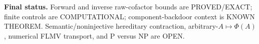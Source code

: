 \documentclass[11pt]{article}
\newcommand{\status}[1]{\textsf{#1}}
\begin{document}
\noindent\textbf{Final status.} Forward and inverse raw-cofactor bounds are \status{PROVED/EXACT}; finite controls are \status{COMPUTATIONAL}; component-backdoor context is \status{KNOWN THEOREM}.  Semantic/noninjective hereditary contraction, arbitrary-$A\mapsto\Phi(A)$, numerical FLMV transport, and P versus NP are \status{OPEN}.
\end{document}
